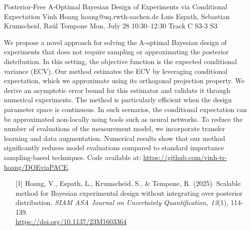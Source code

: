 \begin{talk}
  {Posterior-Free A-Optimal Bayesian Design of Experiments via Conditional Expectation}%
  {Vinh Hoang}%
  {hoang@uq.rwth-aachen.de}%
  {Luis Espath, Sebastian Krumscheid, Ra\'ul Tempone}%
  {}%
  {}%
  {Mon, July 28 10:30–12:30 Track C}%
  {S3-3}%
  {S3}%
  
				
			

\medskip

We propose a novel approach for solving the A-optimal Bayesian design of experiments that does not require sampling or approximating the posterior distribution. In this setting, the objective function is the expected conditional variance (ECV).
Our method estimates the ECV by leveraging conditional expectation, which we approximate using its orthogonal projection property. We derive an asymptotic error bound for this estimator and validate it through numerical experiments.
The method is particularly efficient when the design parameter space is continuous. In such scenarios, the conditional expectation can be approximated non-locally using tools such as neural networks. To reduce the number of evaluations of the measurement model, we incorporate transfer learning and data augmentation.
Numerical results show that our method significantly reduces model evaluations compared to standard importance sampling-based techniques.
Code available at: \href{https://github.com/vinh-tr-hoang/DOEviaPACE}{https://github.com/vinh-tr-hoang/DOEviaPACE}.

\begin{enumerate}
    \item [{[1]}] Hoang, V., Espath, L., Krumscheid, S., \& Tempone, R. (2025).  
    Scalable method for Bayesian experimental design without integrating over posterior distribution. {\it SIAM ASA Journal on Uncertainty Quantification, 13}(1), 114-139. \\
    \href{https://doi.org/10.1137/23M1603364}{https://doi.org/10.1137/23M1603364}
\end{enumerate}


\end{talk}

